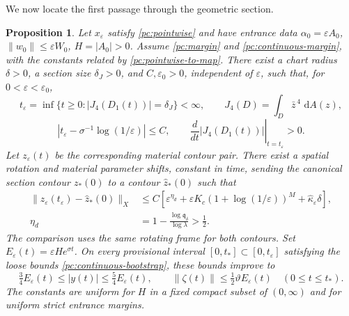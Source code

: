 \documentclass[11pt]{amsart}
\newtheorem{proposition}[theorem]{Proposition}
\theoremstyle{remark}
\numberwithin{equation}{section}
\newcommand{\dd}{\,\mathrm d}
\begin{document}
We now locate the first passage through the geometric section.

\begin{proposition}
\label{pc:continuous-capture}
Let $x_\varepsilon$ satisfy \eqref{pc:pointwise} and have entrance
data $\alpha_0=\varepsilon A_0$, $\|w_0\|\le\varepsilon W_0$,
$H=|A_0|>0$. Assume \eqref{pc:margin} and
\eqref{pc:continuous-margin}, with the constants related by
\eqref{pc:pointwise-to-map}. There exist a chart radius $\delta>0$,
a section size $\delta_J>0$, and $C,\varepsilon_0>0$, independent of
$\varepsilon$, such that, for $0<\varepsilon<\varepsilon_0$,
\[
 t_\varepsilon=\inf\{t\ge0:|J_4(D_1(t))|=\delta_J\}<\infty,
 \qquad J_4(D)=\int_D\bar z^{\,4}\,\dd A(z),
\]
\[
 \left|t_\varepsilon-\sigma^{-1}\log(1/\varepsilon)\right|\le C,
 \qquad
 \left.\frac{d}{dt}|J_4(D_1(t))|\right|_{t=t_\varepsilon}>0.
\]
Let $z_\varepsilon(t)$ be the corresponding material contour pair.
There exist a spatial rotation and material parameter shifts,
constant in time, sending the canonical section contour $z_*(0)$
to a contour $\widehat z_*(0)$ such that
\begin{equation}\label{pc:continuous-reset}
 \begin{split}
 \|z_\varepsilon(t_\varepsilon)-\widehat z_*(0)\|_X
 &\le C\left[\varepsilon^{\eta_d}
  +\varepsilon K_c(1+\log(1/\varepsilon))^M
  +\widehat\kappa_\varepsilon\delta\right],\\
 \eta_d&=1-\frac{\log\mathfrak q_\delta}{\log\lambda}>\frac12.
 \end{split}
\end{equation}
The comparison uses the same rotating frame for both contours.
Set $E_\varepsilon(t)=\varepsilon H e^{\sigma t}$. On every
provisional interval $[0,t_*]\subset[0,t_\varepsilon]$ satisfying
the loose bounds \eqref{pc:continuous-bootstrap}, these bounds improve to
\[
 \tfrac34E_\varepsilon(t)\le|y(t)|\le\tfrac54E_\varepsilon(t),\qquad
 \|\zeta(t)\|\le\tfrac12\vartheta E_\varepsilon(t)
 \quad(0\le t\le t_*).
\]
The constants are uniform for $H$ in a fixed compact subset of
$(0,\infty)$ and for uniform strict entrance margins.
\end{proposition}
\end{document}
